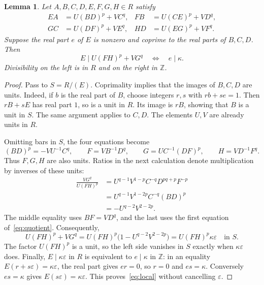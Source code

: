 \documentclass[11pt]{article}
\newtheorem{lemma}[theorem]{Lemma}
\newcommand{\ZZ}{\mathbb Z}
\newcommand{\eps}{\varepsilon}
\begin{document}
\begin{lemma}\label{lem:local}
Let $A,B,C,D,E,F,G,H\in R$ satisfy
\begin{align*}
 EA&=U(BD)^p+VC^q,& FB&=U(CE)^p+VD^q,\\
 GC&=U(DF)^p+VE^q,& HD&=U(EG)^p+VF^q.
\end{align*}
Suppose the real part $e$ of $E$ is nonzero and coprime to the real
parts of $B,C,D$. Then
\begin{equation}\label{eq:local}
 E\mid U(FH)^p+VG^q\quad\Longleftrightarrow\quad e\mid\kappa.
\end{equation}
Divisibility on the left is in $R$ and on the right in $\ZZ$.
\end{lemma}
\begin{proof}
Pass to $S=R/(E)$. Coprimality implies that the images of $B,C,D$
are units. Indeed, if $b$ is the real part of $B$, choose integers
$r,s$ with $rb+se=1$. Then $rB+sE$ has real part $1$, so is a unit
in $R$. Its image is $rB$, showing that $B$ is a unit in $S$.
The same argument applies to $C,D$. The elements $U,V$ are already
units in $R$.

Omitting bars in $S$, the four equations become
\begin{equation}\label{eq:quotient}
 (BD)^p=-VU^{-1}C^q,\qquad
 F=VB^{-1}D^q,\qquad
 G=UC^{-1}(DF)^p,\qquad
 H=VD^{-1}F^q.
\end{equation}
Thus $F,G,H$ are also units. Ratios in the next calculation denote
multiplication by inverses of these units:
\begin{align*}
 \frac{VG^q}{U(FH)^p}
 &=U^{q-1}V^{1-p}C^{-q}D^{pq+p}F^{-p}\\
 &=U^{q-1}V^{1-2p}C^{-q}(BD)^p\\
 &=-U^{q-2}V^{2-2p}.
\end{align*}
The middle equality uses $BF=VD^q$, and the last uses the first
equation of~\eqref{eq:quotient}. Consequently,
\begin{equation}\label{eq:key}
 U(FH)^p+VG^q
 =U(FH)^p\bigl(1-U^{q-2}V^{2-2p}\bigr)
 =U(FH)^p\kappa\eps\quad\text{in }S.
\end{equation}
The factor $U(FH)^p$ is a unit, so the left side vanishes in $S$
exactly when $\kappa\eps$ does. Finally,
$E\mid\kappa\eps$ in $R$ is equivalent to $e\mid\kappa$ in $\ZZ$:
in an equality $E(r+s\eps)=\kappa\eps$, the real part gives $er=0$,
so $r=0$ and $es=\kappa$. Conversely $es=\kappa$ gives
$E(s\eps)=\kappa\eps$. This proves~\eqref{eq:local} without cancelling
$\eps$.
\end{proof}
\end{document}

